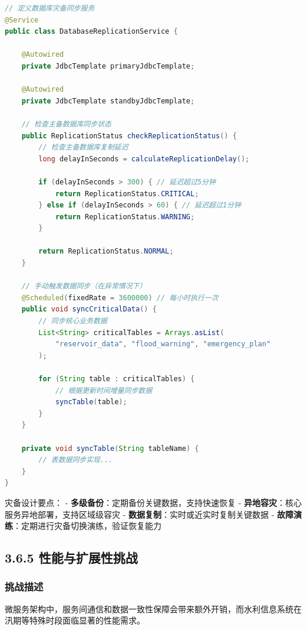 \begin{lstlisting}[language=Java]
// 定义数据库灾备同步服务
@Service
public class DatabaseReplicationService {
    
    @Autowired
    private JdbcTemplate primaryJdbcTemplate;
    
    @Autowired
    private JdbcTemplate standbyJdbcTemplate;
    
    // 检查主备数据库同步状态
    public ReplicationStatus checkReplicationStatus() {
        // 检查主备数据库复制延迟
        long delayInSeconds = calculateReplicationDelay();
        
        if (delayInSeconds > 300) { // 延迟超过5分钟
            return ReplicationStatus.CRITICAL;
        } else if (delayInSeconds > 60) { // 延迟超过1分钟
            return ReplicationStatus.WARNING;
        }
        
        return ReplicationStatus.NORMAL;
    }
    
    // 手动触发数据同步（在异常情况下）
    @Scheduled(fixedRate = 3600000) // 每小时执行一次
    public void syncCriticalData() {
        // 同步核心业务数据
        List<String> criticalTables = Arrays.asList(
            "reservoir_data", "flood_warning", "emergency_plan"
        );
        
        for (String table : criticalTables) {
            // 根据更新时间增量同步数据
            syncTable(table);
        }
    }
    
    private void syncTable(String tableName) {
        // 表数据同步实现...
    }
}
\end{lstlisting}

灾备设计要点： - \textbf{多级备份}：定期备份关键数据，支持快速恢复 -
\textbf{异地容灾}：核心服务异地部署，支持区域级容灾 -
\textbf{数据复制}：实时或近实时复制关键数据 -
\textbf{故障演练}：定期进行灾备切换演练，验证恢复能力

\subsection{3.6.5
性能与扩展性挑战}\label{ux6027ux80fdux4e0eux6269ux5c55ux6027ux6311ux6218}

\subsubsection{挑战描述}\label{ux6311ux6218ux63cfux8ff0-4}

微服务架构中，服务间通信和数据一致性保障会带来额外开销，而水利信息系统在汛期等特殊时段面临显著的性能需求。

